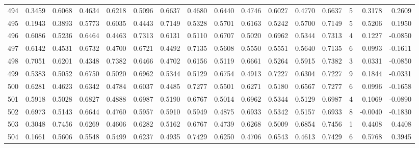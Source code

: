 \begin{tabular}{lrrrrrrrrrrrrrrr}
494 &      0.3459 &  0.6068 &  0.4634 &  0.6218 &  0.5096 &  0.6637 &  0.4680 &  0.6440 &  0.4746 &  0.6027 &   0.4770 &     0.6637 &      5 &                    0.3178 &                     0.2609 \\
495 &      0.1943 &  0.3893 &  0.5773 &  0.6035 &  0.4443 &  0.7149 &  0.5328 &  0.5701 &  0.6163 &  0.5242 &   0.5700 &     0.7149 &      5 &                    0.5206 &                     0.1950 \\
496 &      0.6086 &  0.5236 &  0.6464 &  0.4463 &  0.7313 &  0.6131 &  0.5110 &  0.6707 &  0.5020 &  0.6962 &   0.5344 &     0.7313 &      4 &                    0.1227 &                    -0.0850 \\
497 &      0.6142 &  0.4531 &  0.6732 &  0.4700 &  0.6721 &  0.4492 &  0.7135 &  0.5608 &  0.5550 &  0.5551 &   0.5640 &     0.7135 &      6 &                    0.0993 &                    -0.1611 \\
498 &      0.7051 &  0.6201 &  0.4348 &  0.7382 &  0.6466 &  0.4702 &  0.6156 &  0.5119 &  0.6661 &  0.5264 &   0.5915 &     0.7382 &      3 &                    0.0331 &                    -0.0850 \\
499 &      0.5383 &  0.5052 &  0.6750 &  0.5020 &  0.6962 &  0.5344 &  0.5129 &  0.6754 &  0.4913 &  0.7227 &   0.6304 &     0.7227 &      9 &                    0.1844 &                    -0.0331 \\
500 &      0.6281 &  0.4623 &  0.6342 &  0.4784 &  0.6037 &  0.4485 &  0.7277 &  0.5501 &  0.6271 &  0.5180 &   0.6567 &     0.7277 &      6 &                    0.0996 &                    -0.1658 \\
501 &      0.5918 &  0.5028 &  0.6827 &  0.4888 &  0.6987 &  0.5190 &  0.6767 &  0.5014 &  0.6962 &  0.5344 &   0.5129 &     0.6987 &      4 &                    0.1069 &                    -0.0890 \\
502 &      0.6973 &  0.5143 &  0.6644 &  0.4760 &  0.5957 &  0.5910 &  0.5949 &  0.4875 &  0.6933 &  0.5342 &   0.5157 &     0.6933 &      8 &                   -0.0040 &                    -0.1830 \\
503 &      0.3048 &  0.7456 &  0.6269 &  0.4606 &  0.6282 &  0.5162 &  0.6767 &  0.4739 &  0.6268 &  0.5009 &   0.6854 &     0.7456 &      1 &                    0.4408 &                     0.4408 \\
504 &      0.1661 &  0.5606 &  0.5548 &  0.5499 &  0.6237 &  0.4935 &  0.7429 &  0.6250 &  0.4706 &  0.6543 &   0.4613 &     0.7429 &      6 &                    0.5768 &                     0.3945 \\

\end{tabular}
